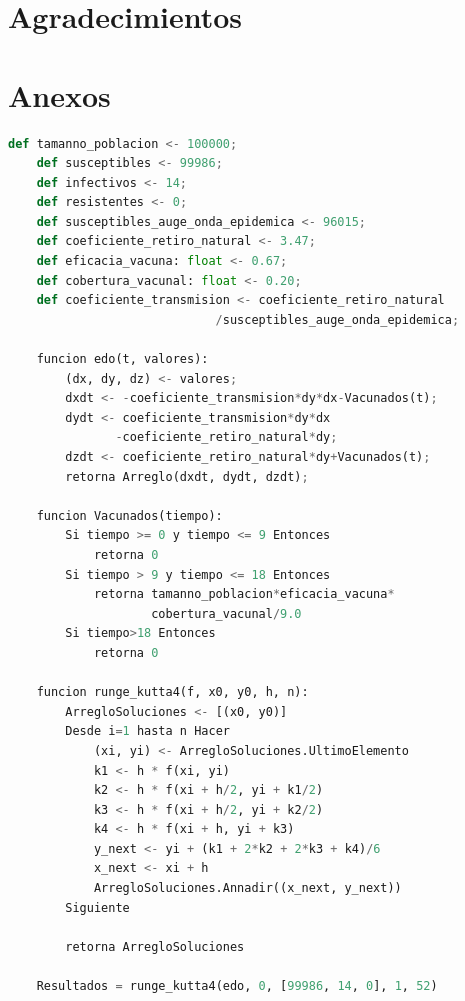 \documentclass{wscpaperproc}
\theoremstyle{wsc}
\begin{document}
\clearpage
\section*{Agradecimientos}


\appendix

\clearpage
\section{Anexos} \label{app:quadratic}
\begin{lstlisting}[language=python]
	def tamanno_poblacion <- 100000;
	def susceptibles <- 99986;
	def infectivos <- 14;
	def resistentes <- 0;
	def susceptibles_auge_onda_epidemica <- 96015;
	def coeficiente_retiro_natural <- 3.47;
	def eficacia_vacuna: float <- 0.67;
	def cobertura_vacunal: float <- 0.20;
	def coeficiente_transmision <- coeficiente_retiro_natural
		                     /susceptibles_auge_onda_epidemica;
	
	funcion edo(t, valores):
	 	(dx, dy, dz) <- valores;
		dxdt <- -coeficiente_transmision*dy*dx-Vacunados(t);
		dydt <- coeficiente_transmision*dy*dx
			   -coeficiente_retiro_natural*dy;
		dzdt <- coeficiente_retiro_natural*dy+Vacunados(t);
		retorna Arreglo(dxdt, dydt, dzdt);
	
	funcion Vacunados(tiempo):
		Si tiempo >= 0 y tiempo <= 9 Entonces
			retorna 0
		Si tiempo > 9 y tiempo <= 18 Entonces
			retorna tamanno_poblacion*eficacia_vacuna*
					cobertura_vacunal/9.0
		Si tiempo>18 Entonces
			retorna 0
	
	funcion runge_kutta4(f, x0, y0, h, n):
		ArregloSoluciones <- [(x0, y0)]
		Desde i=1 hasta n Hacer
			(xi, yi) <- ArregloSoluciones.UltimoElemento
			k1 <- h * f(xi, yi)
			k2 <- h * f(xi + h/2, yi + k1/2)
			k3 <- h * f(xi + h/2, yi + k2/2)
			k4 <- h * f(xi + h, yi + k3)
			y_next <- yi + (k1 + 2*k2 + 2*k3 + k4)/6
			x_next <- xi + h
			ArregloSoluciones.Annadir((x_next, y_next))
		Siguiente	

		retorna ArregloSoluciones

	Resultados = runge_kutta4(edo, 0, [99986, 14, 0], 1, 52)

\end{lstlisting}
\end{document}
